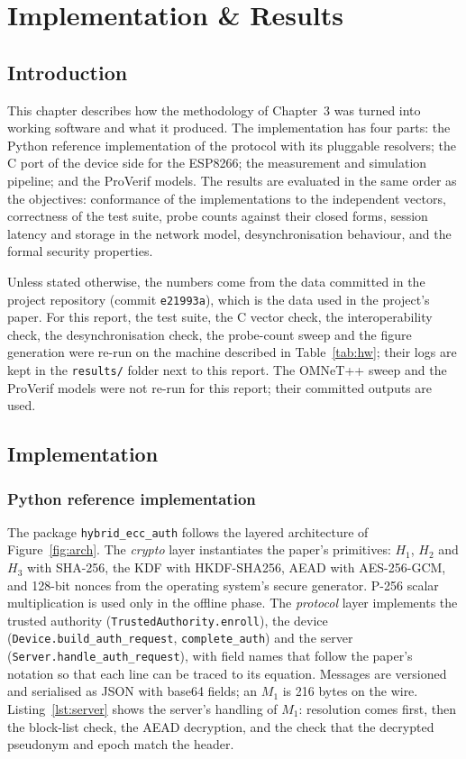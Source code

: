 \chapter{Implementation \& Results}

\section{Introduction}
This chapter describes how the methodology of Chapter~3 was turned into working software and what it produced. The implementation has four parts: the Python reference implementation of the protocol with its pluggable resolvers; the C port of the device side for the ESP8266; the measurement and simulation pipeline; and the ProVerif models. The results are evaluated in the same order as the objectives: conformance of the implementations to the independent vectors, correctness of the test suite, probe counts against their closed forms, session latency and storage in the network model, desynchronisation behaviour, and the formal security properties.

Unless stated otherwise, the numbers come from the data committed in the project repository (commit \texttt{e21993a}), which is the data used in the project's paper. For this report, the test suite, the C vector check, the interoperability check, the desynchronisation check, the probe-count sweep and the figure generation were re-run on the machine described in Table~\ref{tab:hw}; their logs are kept in the \texttt{results/} folder next to this report. The OMNeT++ sweep and the ProVerif models were not re-run for this report; their committed outputs are used.

\section{Implementation}
\subsection*{Python reference implementation}
The package \texttt{hybrid\_ecc\_auth} follows the layered architecture of Figure~\ref{fig:arch}. The \emph{crypto} layer instantiates the paper's primitives: $H_1$, $H_2$ and $H_3$ with SHA-256, the KDF with HKDF-SHA256, AEAD with AES-256-GCM, and 128-bit nonces from the operating system's secure generator. P-256 scalar multiplication is used only in the offline phase. The \emph{protocol} layer implements the trusted authority (\texttt{TrustedAuthority.enroll}), the device (\texttt{Device.build\_auth\_request}, \texttt{complete\_auth}) and the server (\texttt{Server.handle\_auth\_request}), with field names that follow the paper's notation so that each line can be traced to its equation. Messages are versioned and serialised as JSON with base64 fields; an $M_1$ is 216 bytes on the wire. Listing~\ref{lst:server} shows the server's handling of $M_1$: resolution comes first, then the block-list check, the AEAD decryption, and the check that the decrypted pseudonym and epoch match the header.


